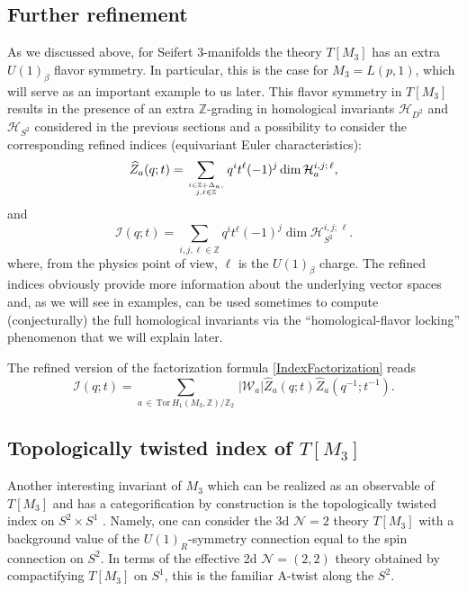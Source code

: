\documentclass[hyper,letterpaper]{JHEP3}
\newcommand{\Z}{{\mathbb Z}}
\renewcommand{\hat}{\widehat}
\def\CH{{\mathcal H}}
\def\CI{{\mathcal I}}
\def\CN{{\mathcal N}}
\def\CW{{\mathcal W}}
\def\Tor{{\mathrm{Tor}\,}}
\begin{document}
\subsection{Further refinement}

As we discussed above, for Seifert 3-manifolds the theory $T[M_3]$ has an extra $U(1)_{\beta}$ flavor symmetry. In particular, this is the case for $M_3=L(p,1)$, which will serve as an important example to us later. This flavor symmetry in $T[M_3]$ results in the presence of an extra $\Z$-grading in homological invariants $\CH_{D^2}$ and $\CH_{S^2}$ considered in the previous sections and a possibility to consider the corresponding refined indices (equivariant Euler characteristics):
\begin{equation}
	\hat{Z}_a(q;t)=\sum_{i\in \Z+\Delta_a,\atop j,\ell \in\Z}q^{i}t^{\ell}(-1)^j\dim\CH^{i,j;\,\ell}_a,
	\label{BlockEuler}
\end{equation}
and
\begin{equation}
\CI(q;t)=\sum_{i,j,\ell\in\Z}q^{i}t^{\ell}(-1)^j\dim\CH_{S^2}^{i,j;\,\ell}.
\end{equation}
where, from the physics point of view, $\ell$ is the $U(1)_{\beta}$ charge.
The refined indices obviously provide more information about the underlying vector spaces and, as we will see in examples, can be used sometimes to compute (conjecturally) the full homological invariants via the ``homological-flavor locking'' phenomenon that we will explain later.

The refined version of the factorization formula \eqref{IndexFactorization} reads
\begin{equation}
		\CI(q;t)=\sum_{a\,\in\, \Tor H_1(M_3,\Z)/\Z_2}\, |\CW_a|\hat{Z}_a(q;t)\hat{Z}_a(q^{-1};t^{-1}).
		\label{IndexRefDecomp}
\end{equation}


\subsection{Topologically twisted index of ${T[M_3]}$}

Another interesting invariant of $M_3$ which can be realized as an observable of $T[M_3]$ and has a categorification by construction is the topologically twisted index on $S^2\times S^1$ \cite{Benini:2015noa}. Namely, one can consider the 3d $\CN=2$ theory $T[M_3]$ with a background value of the $U(1)_R$-symmetry connection equal to the spin connection  on $S^2$. In terms of the effective 2d $\CN=(2,2)$ theory obtained by compactifying $T[M_3]$ on $S^1$, this is the familiar A-twist along the $S^2$.
\end{document}
